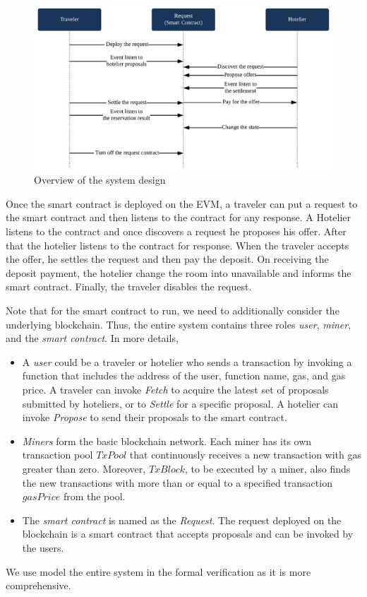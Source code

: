 \documentclass{KERauth}
\begin{document}
\begin{figure}[t]
\includegraphics[width=\textwidth]{mec.jpg}
\caption{Overview of the system design}
\label{fig:overview}
\end{figure}

Once the smart contract is deployed on the EVM, a traveler can put a request to the smart contract and then listens to the contract for any response. A Hotelier listens to the contract and once discovers a request he proposes his offer. After that the hotelier listens to the contract for response. When the traveler accepts the offer, he settles the request and then pay the deposit. On receiving the deposit payment, the hotelier change the room into unavailable and informs the smart contract. Finally, the traveler disables the request.

Note that for the smart contract to run, we need to additionally consider the underlying blockchain. Thus, the entire system contains three roles \emph{user}, \emph{miner}, and the \emph{smart contract}. In more details, 
\begin{itemize}
    \item A \emph{user} could be a traveler or hotelier who sends a transaction by invoking a function that includes
the address of the user, function name, gas, and gas price. A traveler can invoke \emph{Fetch} to acquire the latest
set of proposals submitted by hoteliers, or to \emph{Settle} for a specific proposal.
A hotelier can invoke \emph{Propose}
to send their proposals to the smart contract.
\item \emph{Miners} form the basic blockchain network. Each miner has its own transaction pool $TxPool$ that continuously receives a new transaction with
gas greater than zero. Moreover, $TxBlock$, to be executed by a miner, also finds the new transactions with
more than or equal to a specified transaction $gasPrice$ from the pool.
\item The \emph{smart contract} is named as the \emph{Request}. The request deployed on the blockchain is a smart contract that accepts proposals
and can be invoked by the users.
\end{itemize}
We use model the entire system in the formal verification as it is more comprehensive. 
\end{document}
